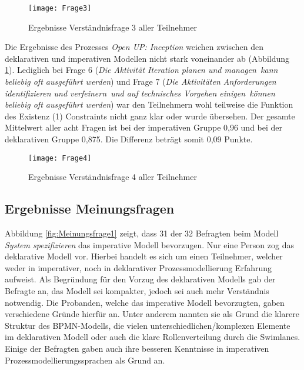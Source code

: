 \begin{figure}[htp]
\begin{center}
  \texttt{[image: Frage3]} %
  \caption{Ergebnisse Verständnisfrage 3 aller Teilnehmer}
  \label{fig:Frage3}
\end{center}
\end{figure}

Die Ergebnisse des Prozesses \textit{Open UP: Inception} weichen zwischen den deklarativen und imperativen Modellen nicht stark voneinander ab (Abbildung \ref{fig:Frage3}). \newline
Lediglich bei Frage 6 (\textit{Die Aktivität \grqq Iteration planen und managen\grqq \ kann beliebig oft ausgeführt werden}) und Frage 7 (\textit{Die Aktivitäten \grqq Anforderungen identifizieren und verfeinern\grqq \ und \grqq auf technisches Vorgehen einigen\grqq \ können beliebig oft ausgeführt werden}) war den Teilnehmern wohl teilweise die Funktion des Existenz (1) Constraints nicht ganz klar oder wurde übersehen.\newline
Der gesamte Mittelwert aller acht Fragen ist bei der imperativen Gruppe 0,96 und bei der deklarativen Gruppe 0,875. Die Differenz beträgt somit 0,09 Punkte. \newline


\begin{figure}[htp]
\begin{center}
  \texttt{[image: Frage4]} %
  \caption{Ergebnisse Verständnisfrage 4 aller Teilnehmer}
  \label{fig:Frage4}
\end{center}
\end{figure}

\clearpage


\subsection{Ergebnisse Meinungsfragen}

Abbildung \ref{fig:Meinungsfrage1} zeigt, dass 31 der 32 Befragten beim Modell \textit{System spezifizieren} das imperative Modell bevorzugen. Nur eine Person zog das deklarative Modell vor. Hierbei handelt es sich um einen Teilnehmer, welcher weder in imperativer, noch in deklarativer Prozessmodellierung Erfahrung aufweist. Als Begründung für den Vorzug des deklarativen Modells gab der Befragte an, das Modell sei kompakter, jedoch sei auch mehr Verständnis notwendig.\newline
Die Probanden, welche das imperative Modell bevorzugten, gaben verschiedene Gründe hierfür an. Unter anderem nannten sie als Grund die klarere Struktur des BPMN-Modells, die vielen unterschiedlichen/komplexen Elemente im deklarativen Modell oder auch die klare Rollenverteilung durch die Swimlanes. Einige der Befragten gaben auch ihre besseren Kenntnisse in imperativen Prozessmodellierungssprachen als Grund an.\newline

